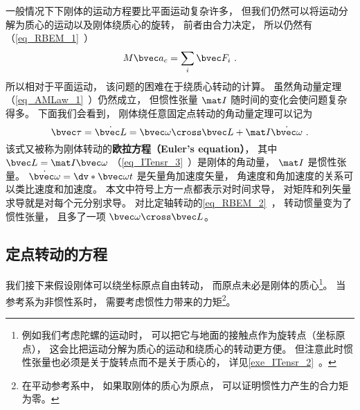 

一般情况下下刚体的运动方程要比平面运动复杂许多， 但我们仍然可以将运动分解为质心的运动以及刚体绕质心的旋转， 前者由合力决定， 所以仍然有（\autoref{eq_RBEM_1}~）
\begin{equation}\label{eq_RBEqM_8}
M\bvec a_c = \sum_i \bvec F_i~.
\end{equation}
所以相对于平面运动， 该问题的困难在于绕质心转动的计算。 虽然角动量定理（\autoref{eq_AMLaw_1}~）仍然成立， 但惯性张量 $\mat I$ 随时间的变化会使问题复杂得多。 下面我们会看到， 刚体绕任意固定点转动的角动量定理可以记为
\begin{equation}\label{eq_RBEqM_1}
\bvec\tau = \dot{\bvec L} = \bvec\omega \cross \bvec L + \mat I \dot{\bvec\omega}~.
\end{equation}
该式又被称为刚体转动的\textbf{欧拉方程（Euler's equation）}， 其中 $\bvec L = \mat I\bvec\omega$ （\autoref{eq_ITensr_3}~）是刚体的角动量， $\mat I$ 是惯性张量。 $\dot{\bvec\omega} = \dv*{\bvec\omega}{t}$ 是矢量角加速度矢量， 角速度和角加速度的关系可以类比速度和加速度。 本文中符号上方一点都表示对时间求导， 对矩阵和列矢量求导就是对每个元分别求导。  对比定轴转动的\autoref{eq_RBEM_2}~， 转动惯量变为了惯性张量， 且多了一项 $\bvec\omega \cross \bvec L$。

\subsection{定点转动的方程}
我们接下来假设刚体可以绕坐标原点自由转动， 而原点未必是刚体的质心\footnote{例如我们考虑陀螺的运动时， 可以把它与地面的接触点作为旋转点（坐标原点）， 这会比把运动分解为质心的运动和绕质心的转动更方便。 但注意此时惯性张量也必须是关于旋转点而不是关于质心的， 详见\autoref{exe_ITensr_2}~。}。 当参考系为非惯性系时， 需要考虑惯性力带来的力矩\footnote{在平动参考系中， 如果取刚体的质心为原点， 可以证明惯性力产生的合力矩为零。}。

